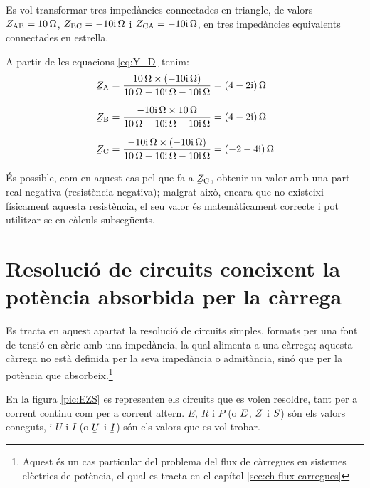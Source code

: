 	
\begin{exemple}\label{ex:TriangleEstrella}
	\addcontentsxms{\TriangleEstrella}
    Es vol transformar tres impedàncies connectades en triangle, de
    valors $ \cmplx{Z}\ped{AB}=\qty{10}{\ohm}$,
    $\cmplx{Z}\ped{BC}=\complexqty{-j10}{\ohm}$ i
    $\cmplx{Z}\ped{CA}=\complexqty{-j10}{\ohm}$, en tres impedàncies
    equivalents connectades en estrella.

    A partir de les equacions \eqref{eq:Y_D}  tenim:
    \begin{align*}
       \cmplx{Z}\ped{A} & = \frac{\qty{10}{\ohm}\times(\complexqty{-j10}{\ohm})}{\qty{10}{\ohm} - \complexqty{j10}{\ohm} - \complexqty{j10}{\ohm}} = \complexqty{4-j2}{\ohm} \\[1.5ex]
       \cmplx{Z}\ped{B} & = \frac{\complexqty{-j10}{\ohm}\times \qty{10}{\ohm}}{\qty{10}{\ohm} - \complexqty{j10}{\ohm} - \complexqty{j10}{\ohm}} = \complexqty{4-j2}{\ohm} \\[1.5ex]
    \cmplx{Z}\ped{C} &= \frac{\complexqty{-j10}{\ohm}\times(\complexqty{-j10}{\ohm})}{\qty{10}{\ohm} -
    \complexqty{j10}{\ohm} - \complexqty{j10}{\ohm}} = \complexqty{-2-j4}{\ohm}
    \end{align*}

    És possible, com en aquest cas pel que fa a $\cmplx{Z}\ped{C}$,
    obtenir un valor amb una part real negativa (resistència negativa);
    malgrat això, encara que no existeixi físicament aquesta resistència,
    el seu valor és matemàticament correcte i  pot utilitzar-se en
    càlculs subsegüents.
\end{exemple}



\section{Resolució de circuits coneixent la potència absorbida per la
càrrega}\label{sec:EZS}

Es tracta en aquest apartat la resolució de circuits simples,
formats per una font de tensió en sèrie amb una impedància, la qual
alimenta a una càrrega; aquesta càrrega no està definida per la seva
impedància o admitància, sinó que per la potència que absorbeix.\footnote{Aquest és un cas particular del problema del flux de càrregues en sistemes elèctrics de potència, el qual es tracta en el capítol \ref{sec:ch-flux-carregues}}

En la figura \vref{pic:EZS} es representen els circuits que es volen
resoldre, tant per a corrent continu com per a corrent altern. $E$,
$R$ i $P$ (o $\cmplx{E}$, $\cmplx{Z}$ i $\cmplx{S}$) són els valors
coneguts, i $U$ i $I$ (o $\cmplx{U}$ i $\cmplx{I}$) són els valors
que es vol trobar.

